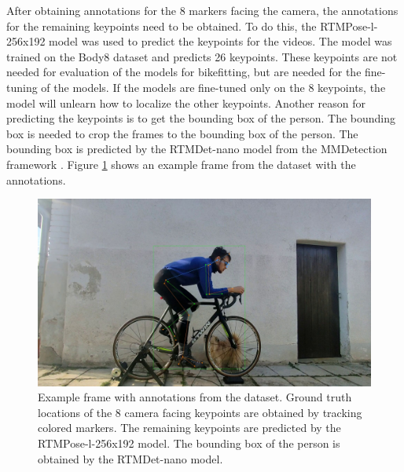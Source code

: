 






After obtaining annotations for the 8 markers facing the camera, the annotations for the remaining keypoints need to be obtained. To do this, the RTMPose-l-256x192 model was used to predict the keypoints for the videos. The model was trained on the Body8 dataset and predicts 26 keypoints. These keypoints are not needed for evaluation of the models for bikefitting, but are needed for the fine-tuning of the models. If the models are fine-tuned only on the 8 keypoints, the model will unlearn how to localize the other keypoints. Another reason for predicting the keypoints is to get the bounding box of the person. The bounding box is needed to crop the frames to the bounding box of the person. The bounding box is predicted by the RTMDet-nano model \cite{rtmdet} from the MMDetection framework \cite{mmdetection}. Figure \ref{fig:dataset_annotations} shows an example frame from the dataset with the annotations.

\begin{figure}[htbp]
    \centering
    \includegraphics[width=1\linewidth]{obrazky-figures/annotations_1.jpg}

    \caption{Example frame with annotations from the dataset. Ground truth locations of the 8 camera facing keypoints are obtained by tracking colored markers. The remaining keypoints are predicted by the RTMPose-l-256x192 model. The bounding box of the person is obtained by the RTMDet-nano model.}
    \label{fig:dataset_annotations}
\end{figure}




